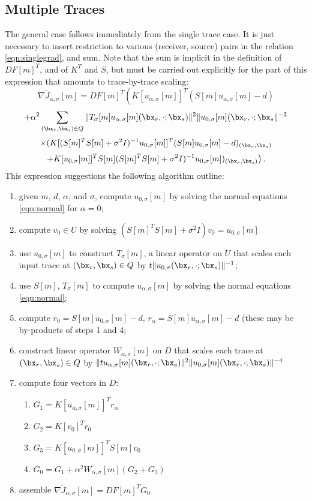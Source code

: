 \subsection{Multiple Traces}
The general case follows immediately from the single trace case. It is just necessary to insert restriction to various (receiver, source) pairs in the relation \ref{eqn:singlegrad}, and sum. Note that the sum is implicit in the definition of $DF[m]^T$, and of $K^T$ and $S$, but must be carried out explicitly for the part of this expression that amounts to trace-by-trace scaling:
\[
  \nabla \tilde{J}_{\alpha,\sigma}[m] = DF[m]^T\left( K[u_{\alpha,\sigma}[m]]^T(S[m]u_{\alpha,\sigma}[m]-d)\right.
\]
\[
  \left.  +\alpha^2 \sum_{(\bx_r,\bx_s)\in Q}\|T_{\sigma}[m]u_{\alpha,\sigma}[m](\bx_r,\cdot;\bx_s)\|^2\| u_{0,\sigma}[m](\bx_r,\cdot;\bx_s\|^{-2}\right.
\]
\[
  \left. \times( K[(S[m]^TS[m] + \sigma^2I)^{-1}u_{0,\sigma}[m]]^T (S[m]u_{0,\sigma}[m]-d)_{(\bx_r,\bx_s)} \right.
\]
\begin{equation}
  \label{eqn:singlegrad}
\left.+K[u_{0,\sigma}[m]]^T S[m](S[m]^TS[m] + \sigma^2I)^{-1}u_{0,\sigma}[m]) _{(\bx_r,\bx_s)} \right).
\end{equation}
This expression suggestions the following algorithm outline:
\begin{enumerate}
\item given $m$, $d$, $\alpha$, and $\sigma$, compute $u_{0,\sigma}[m]$ by solving the normal equations \ref{eqn:normal} for $\alpha=0$;
\item compute $v_0 \in U$ by solving $(S[m]^TS[m] + \sigma^2 I)v_0 = u_{0,\sigma}[m]$
\item use $u_{0,\sigma}[m]$ to construct $T_{\sigma}[m]$, a linear operator on $U$  that scales each input trace at $(\bx_r,\bx_s) \in Q$  by $t\|u_{0,\sigma}(\bx_r,\cdot;\bx_s)\|^{-1}$;
\item use $S[m]$, $T_{\sigma}[m]$ to compute $u_{\alpha,\sigma}[m]$ by solving the normal equations \ref{eqn:normal};
\item compute $r_0 = S[m]u_{0,\sigma}[m]-d,\,r_{\alpha} = S[m]u_{\alpha,\sigma}[m]-d$ (these may be by-products of steps 1 and 4;
\item construct linear operator $W_{\alpha,\sigma}[m]$ on $D$ that scales each trace at $(\bx_r,\bx_s) \in Q$  by $ \|tu_{\alpha,\sigma}[m](\bx_r,\cdot;\bx_s)\|^2\|u_{0,\sigma}[m](\bx_r,\cdot;\bx_s)\|^{-4}$
\item compute four vectors in $D$:
  \begin{enumerate}
  \item $G_1 = K[u_{\alpha,\sigma}[m]]^Tr_{\alpha}$
  \item $G_2 = K[v_0]^Tr_0$
  \item $G_3 = K[u_{0,\sigma}[m]]^TS[m]v_0$
  \item $G_0 = G_1 + \alpha^2W_{\alpha,\sigma}[m](G_2 + G_3)$
  \end{enumerate}
\item assemble
  $\nabla \tilde{J}_{\alpha,\sigma}[m] = DF[m]^TG_0$
\end{enumerate}


